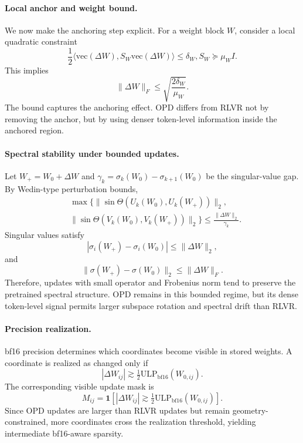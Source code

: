 \paragraph{Local anchor and weight bound.}
We now make the anchoring step explicit. For a weight block $W$, consider a
local quadratic constraint
\begin{equation}
\frac{1}{2}
\langle
\mathrm{vec}(\Delta W),
S_W \mathrm{vec}(\Delta W)
\rangle
\leq
\delta_W,
S_W \succeq \mu_W I .
\end{equation}
This implies
\begin{equation}
\|\Delta W\|_F
\leq
\sqrt{\frac{2\delta_W}{\mu_W}} .
\label{eq:app_weight_bound}
\end{equation}
The bound captures the anchoring effect. OPD differs from RLVR not by removing
the anchor, but by using denser token-level information inside the anchored
region.

\paragraph{Spectral stability under bounded updates.}
Let $W_+=W_0+\Delta W$ and
$\gamma_k=\sigma_k(W_0)-\sigma_{k+1}(W_0)$ be the singular-value gap. By
Wedin-type perturbation bounds,
\begin{equation}
\begin{split}
&\max\{
\|\sin\Theta(U_k(W_0),U_k(W_+))\|_2, \\
&
\|\sin\Theta(V_k(W_0),V_k(W_+))\|_2
\}
\leq
\frac{\|\Delta W\|_2}{\gamma_k}.
\end{split}
\end{equation}
Singular values satisfy
\begin{equation}
|\sigma_i(W_+) - \sigma_i(W_0)|
\leq
\|\Delta W\|_2,
\end{equation}
and
\begin{equation}
\|\sigma(W_+) - \sigma(W_0)\|_2
\leq
\|\Delta W\|_F .
\end{equation}
Therefore, updates with small operator and Frobenius norm tend to preserve the
pretrained spectral structure. OPD remains in this bounded regime, but its
dense token-level signal permits larger subspace rotation and spectral drift
than RLVR.

\paragraph{Precision realization.}
bf16 precision determines which coordinates become visible in stored weights.
A coordinate is realized as changed only if
\begin{equation}
|\Delta W_{ij}|
\gtrsim
\tfrac{1}{2}
\mathrm{ULP}_{\mathrm{bf16}}(W_{0,ij}).
\end{equation}
The corresponding visible update mask is
\begin{equation}
M_{ij}
=
\mathbf{1}
\left[
|\Delta W_{ij}|
\gtrsim
\tfrac{1}{2}
\mathrm{ULP}_{\mathrm{bf16}}(W_{0,ij})
\right].
\end{equation}
Since OPD updates are larger than RLVR updates but remain
geometry-constrained, more coordinates cross the realization threshold,
yielding intermediate bf16-aware sparsity.

